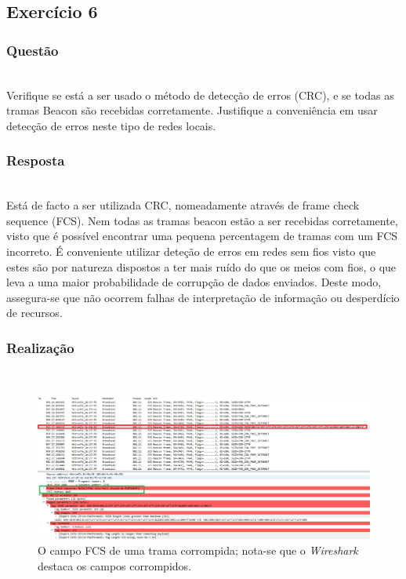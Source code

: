 \documentclass{llncs}
\begin{document}
\clearpage
\subsection{Exercício 6}
\subsubsection{Questão}\rule[-10pt]{0pt}{10pt}\\

Verifique se está a ser usado o método de detecção de erros (CRC), e se todas as tramas Beacon são recebidas corretamente. Justifique a conveniência em usar detecção de erros neste tipo de redes locais.

\subsubsection{Resposta}\rule[-10pt]{0pt}{10pt}\\

Está de facto a ser utilizada CRC, nomeadamente através de frame check sequence (FCS). Nem todas as tramas beacon estão a ser recebidas corretamente, visto que é possível encontrar uma pequena percentagem de tramas com um FCS incorreto.
É conveniente utilizar deteção de erros em redes sem fios visto que estes são por natureza dispostos a ter mais ruído do que os meios com fios, o que leva a uma maior probabilidade de corrupção de dados enviados. Deste modo, assegura-se que não ocorrem falhas de interpretação de informação ou desperdício de recursos.

\subsubsection{Realização}\rule[-10pt]{0pt}{10pt}\\

\begin{figure}
  \begin{center}
  \includegraphics[scale=0.35]{imagens/FCS.png} 
  \end{center}
  \caption{O campo FCS de uma trama corrompida; nota-se que o \textit{Wireshark} destaca os campos corrompidos.}
  \label{fig:fcs_field}
\end{figure}
\end{document}
